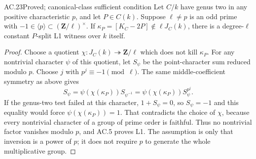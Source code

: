 \begin{claim}{AC.23}{Proved; canonical-class sufficient condition}
Let $C/k$ have genus two in any positive characteristic $p$, and let
$P\in C(k)$.  Suppose $\ell\ne p$ is an odd prime with
$-1\in\langle p\rangle\subset(\mathbf Z/\ell)^\times$.
If $\kappa_P=[K_C-2P]\notin\ell J_C(k)$, there is a degree-$\ell$
constant $P$-split L1 witness over $k$ itself.
\end{claim}
\begin{proof}
Choose a quotient $\chi:J_C(k)\twoheadrightarrow\mathbf Z/\ell$
which does not kill $\kappa_P$.  For any nontrivial character $\psi$
of this quotient, let $S_\psi$ be the point-character sum reduced
modulo $p$.  Choose $j$ with $p^j\equiv-1\pmod\ell$.
The same middle-coefficient symmetry as above gives
\[
          S_\psi=\psi(\chi(\kappa_P))S_{\psi^{-1}}
                =\psi(\chi(\kappa_P))S_\psi^{p^j}.
\]
If the genus-two test failed at this character, $1+S_\psi=0$,
so $S_\psi=-1$ and this equality would force
$\psi(\chi(\kappa_P))=1$.  That contradicts the choice of $\chi$,
because every nontrivial character of a group of prime order is
faithful.  Thus no nontrivial factor vanishes modulo $p$, and AC.5
proves L1.  The assumption is only that inversion is a power of $p$;
it does not require $p$ to generate the whole multiplicative group.
\end{proof}

